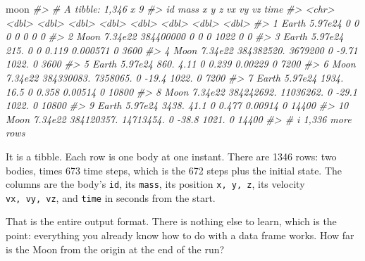 \documentclass[
  10.5pt,
  letterpaper,
]{scrbook}
\newenvironment{Shaded}{\begin{snugshade}}{\end{snugshade}}
\newcommand{\CommentTok}[1]{\textcolor[rgb]{0.00,0.00,0.00}{\textit{#1}}}
\newcommand{\NormalTok}[1]{\textcolor[rgb]{0.00,0.00,0.00}{#1}}
\theoremstyle{plain}
\theoremstyle{remark}
\begin{document}
\begin{Shaded}
\begin{Highlighting}[]
\NormalTok{moon}
\CommentTok{\#\textgreater{} \# A tibble: 1,346 x 9}
\CommentTok{\#\textgreater{}    id       mass          x           y     z      vx          vy    vz  time}
\CommentTok{\#\textgreater{}    \textless{}chr\textgreater{}   \textless{}dbl\textgreater{}      \textless{}dbl\textgreater{}       \textless{}dbl\textgreater{} \textless{}dbl\textgreater{}   \textless{}dbl\textgreater{}       \textless{}dbl\textgreater{} \textless{}dbl\textgreater{} \textless{}dbl\textgreater{}}
\CommentTok{\#\textgreater{}  1 Earth 5.97e24         0         0        0   0        0            0     0}
\CommentTok{\#\textgreater{}  2 Moon  7.34e22 384400000         0        0   0     1022            0     0}
\CommentTok{\#\textgreater{}  3 Earth 5.97e24       215.        0        0   0.119    0.000571     0  3600}
\CommentTok{\#\textgreater{}  4 Moon  7.34e22 384382520.  3679200        0  {-}9.71  1022.           0  3600}
\CommentTok{\#\textgreater{}  5 Earth 5.97e24       860.        4.11     0   0.239    0.00229      0  7200}
\CommentTok{\#\textgreater{}  6 Moon  7.34e22 384330083.  7358065.       0 {-}19.4   1022.           0  7200}
\CommentTok{\#\textgreater{}  7 Earth 5.97e24      1934.       16.5      0   0.358    0.00514      0 10800}
\CommentTok{\#\textgreater{}  8 Moon  7.34e22 384242692. 11036262.       0 {-}29.1   1022.           0 10800}
\CommentTok{\#\textgreater{}  9 Earth 5.97e24      3438.       41.1      0   0.477    0.00914      0 14400}
\CommentTok{\#\textgreater{} 10 Moon  7.34e22 384120357. 14713454.       0 {-}38.8   1021.           0 14400}
\CommentTok{\#\textgreater{} \# i 1,336 more rows}
\end{Highlighting}
\end{Shaded}

It is a tibble. Each row is one body at one instant. There are 1346
rows: two bodies, times 673 time steps, which is the 672 steps plus the
initial state. The columns are the body's \texttt{id}, its
\texttt{mass}, its position \texttt{x,\ y,\ z}, its velocity
\texttt{vx,\ vy,\ vz}, and \texttt{time} in seconds from the start.

That is the entire output format. There is nothing else to learn, which
is the point: everything you already know how to do with a data frame
works. How far is the Moon from the origin at the end of the run?
\end{document}
